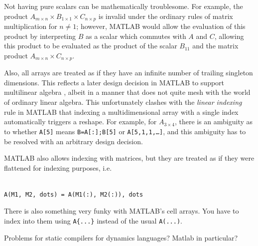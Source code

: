\documentclass[preprint]{sigplanconf}
\newcommand{\MATLAB}{\textsc{MATLAB}}
\begin{document}
Not having pure scalars can be mathematically troublesome. For example, the
product $A_{m\times n} \times B_{1\times 1} \times C_{n\times p}$ is invalid
under the ordinary rules of matrix multiplication for $n\ne1$; however,
\MATLAB{} would allow the evaluation of this product by interpreting $B$ as a
scalar which commutes with $A$ and $C$, allowing this product to be evaluated
as the product of the scalar $B_{11}$ and the matrix product $A_{m\times n}
\times C_{n\times p}$.


Also, all arrays are treated as if they have an infinite number of trailing
singleton dimensions. This reflects a later design decision in \MATLAB{} to
support multilinear algebra \cite{matlabman:ma},  albeit in a manner that does
not quite mesh with the world of ordinary linear algebra. This unfortunately
clashes with the \textit{linear indexing} rule in \MATLAB{} that indexing a
multidimensional array with a single index automatically triggers a reshape.
For example, for $A_{3\times4}$, there is an ambiguity as to whether
\texttt{A[5]} means \texttt{B=A[:];B[5]} or \texttt{A[5,1,1,\dots]}, and this
ambiguity has to be resolved with an arbitrary design decision.

\MATLAB{} also allows indexing with matrices, but they are treated as if they
were flattened for indexing purposes, i.e.

\begin{verbatim}

A(M1, M2, dots) = A(M1(:), M2(:)), dots

\end{verbatim}

There is also something very funky with \MATLAB's cell arrays. You have to
index into them using \texttt{A\{...\}} instead of the usual \texttt{A(...)}.


Problems for static compilers for dynamics languages? Matlab in particular?


\end{document}

